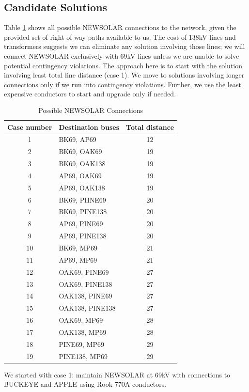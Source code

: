 \documentclass[conference]{IEEEtran}
\begin{document}
\subsection{Candidate Solutions}
Table \ref{tab:all_conn} shows all possible NEWSOLAR connections to the network, given the provided set of right-of-way paths available to us. The cost of 138kV lines and transformers suggests we can eliminate any solution involving those lines; we will connect NEWSOLAR exclusively with 69kV lines unless we are unable to solve potential contingency violations. The approach here is to start with the solution involving least total line distance (case 1). We move to solutions involving longer connections only if we run into contingency violations. Further, we use the least expensive conductors to start and upgrade only if needed. 
\begin{table}[h]
	\centering
	\begin{tabular}{|c|l|c|}
		\hline
		\textbf{Case number} & \textbf{Destination buses} & \textbf{Total distance} \\
		\hline
		1 & BK69, AP69 & 12 \\
		2 & BK69, OAK69 & 19 \\
		3 & BK69, OAK138 & 19 \\
		4 & AP69, OAK69 & 19 \\
		5 & AP69, OAK138 & 19 \\
		6 & BK69, PIINE69 & 20 \\
		7 & BK69, PINE138 & 20 \\
		8 & AP69, PINE69 & 20 \\
		9 & AP69, PINE138 & 20 \\
		10 & BK69, MP69 & 21 \\
		11 & AP69, MP69 & 21 \\
		12 & OAK69, PINE69 & 27 \\
		13 & OAK69, PINE138 & 27 \\
		14 & OAK138, PINE69 & 27 \\
		15 & OAK138, PINE138 & 27 \\
		16 & OAK69, MP69 & 28 \\
		17 & OAK138, MP69 & 28 \\
		18 & PINE69, MP69 & 29 \\
		19 & PINE138, MP69 & 29 \\
		\hline
	\end{tabular}
	\vspace{0.5em}
	\caption{Possible NEWSOLAR Connections}
	\label{tab:all_conn}
\end{table}
We started with case 1: maintain NEWSOLAR at 69kV with connections to BUCKEYE and APPLE using Rook 770A conductors. 
\end{document}
